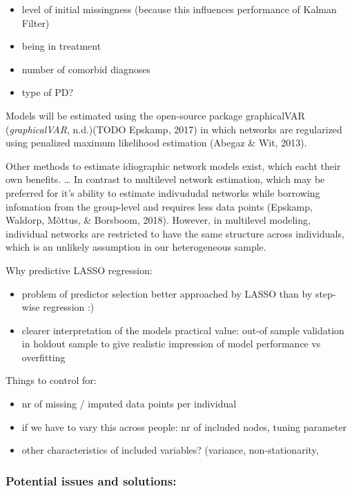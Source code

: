 \documentclass[
  english,
  man]{apa6}
\begin{document}
\begin{itemize}
\item
  level of initial missingness (because this influences performance of Kalman Filter)
\item
  being in treatment
\item
  number of comorbid diagnoses
\item
  type of PD?
\end{itemize}

Models will be estimated using the open-source package graphicalVAR (\emph{graphicalVAR}, n.d.)(TODO Epskamp, 2017) in which networks are regularized using penalized maximum likelihood estimation (Abegaz \& Wit, 2013).

Other methods to estimate idiographic network models exist, which eacht their own benefits. \ldots{} In contrast to multilevel network estimation, which may be preferred for it's ability to estimate indivududal networks while borrowing infomation from the group-level and requires less data points (Epskamp, Waldorp, Mõttus, \& Borsboom, 2018). However, in multilevel modeling, individual networks are restricted to have the same structure across individuals, which is an unlikely assumption in our heterogeneous sample.

Why predictive LASSO regression:

\begin{itemize}
\item
  problem of predictor selection better approached by LASSO than by step-wise regression :)
\item
  clearer interpretation of the models practical value: out-of sample validation in holdout sample to give realistic impression of model performance vs overfitting
\end{itemize}

Things to control for:

\begin{itemize}
\item
  nr of missing / imputed data points per individual
\item
  if we have to vary this across people: nr of included nodes, tuning parameter
\item
  other characteristics of included variables? (variance, non-stationarity,
\end{itemize}

\hypertarget{potential-issues-and-solutions}{%
\subsubsection{Potential issues and solutions:}\label{potential-issues-and-solutions}}
\end{document}
